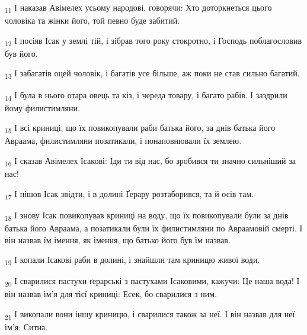 \begin{tcolorbox}
\textsubscript{11} І наказав Авімелех усьому народові, говорячи: Хто доторкнеться цього чоловіка та жінки його, той певно буде забитий.
\end{tcolorbox}
\begin{tcolorbox}
\textsubscript{12} І посіяв Ісак у землі тій, і зібрав того року стокротно, і Господь поблагословив був його.
\end{tcolorbox}
\begin{tcolorbox}
\textsubscript{13} І забагатів оцей чоловік, і багатів усе більше, аж поки не став сильно багатий.
\end{tcolorbox}
\begin{tcolorbox}
\textsubscript{14} І була в нього отара овець та кіз, і череда товару, і багато рабів. І заздрили йому филистимляни.
\end{tcolorbox}
\begin{tcolorbox}
\textsubscript{15} І всі криниці, що їх повикопували раби батька його, за днів батька його Авраама, филистимляни позатикали, і понаповнювали їх землею.
\end{tcolorbox}
\begin{tcolorbox}
\textsubscript{16} І сказав Авімелех Ісакові: Іди ти від нас, бо зробився ти значно сильніший за нас!
\end{tcolorbox}
\begin{tcolorbox}
\textsubscript{17} І пішов Ісак звідти, і в долині Ґерару розтаборився, та й осів там.
\end{tcolorbox}
\begin{tcolorbox}
\textsubscript{18} І знову Ісак повикопував криниці на воду, що їх повикопували були за днів батька його Авраама, а позатикали були їх филистимляни по Авраамовій смерті. І він назвав їм імення, як імення, що батько його був їм назвав.
\end{tcolorbox}
\begin{tcolorbox}
\textsubscript{19} І копали Ісакові раби в долині, і знайшли там криницю живої води.
\end{tcolorbox}
\begin{tcolorbox}
\textsubscript{20} І сварилися пастухи ґерарські з пастухами Ісаковими, кажучи: Це наша вода! І він назвав ім'я для тієї криниці: Есек, бо сварилися з ним.
\end{tcolorbox}
\begin{tcolorbox}
\textsubscript{21} І викопали вони іншу криницю, і сварилися також за неї. І він назвав для неї ім'я: Ситна.
\end{tcolorbox}
